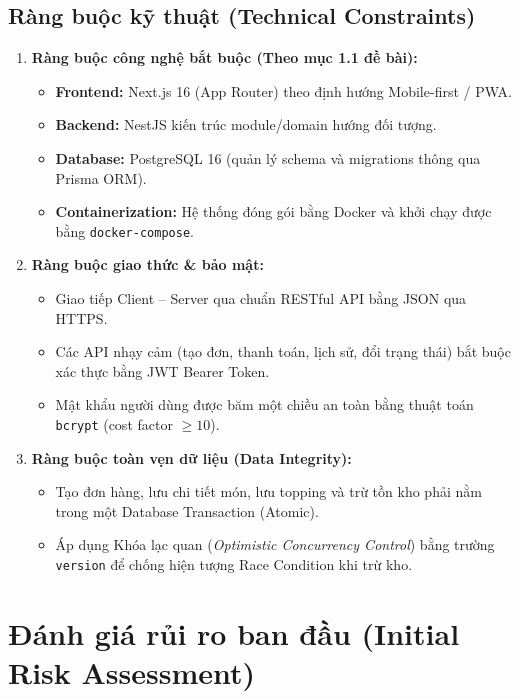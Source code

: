 \documentclass[12pt,a4paper]{article}
\begin{document}
\subsection{Ràng buộc kỹ thuật (Technical Constraints)}
\begin{enumerate}[leftmargin=*,itemsep=2pt]
    \item \textbf{Ràng buộc công nghệ bắt buộc (Theo mục 1.1 đề bài):}
    \begin{itemize}
        \item \textbf{Frontend:} Next.js 16 (App Router) theo định hướng Mobile-first / PWA.
        \item \textbf{Backend:} NestJS kiến trúc module/domain hướng đối tượng.
        \item \textbf{Database:} PostgreSQL 16 (quản lý schema và migrations thông qua Prisma ORM).
        \item \textbf{Containerization:} Hệ thống đóng gói bằng Docker và khởi chạy được bằng \texttt{docker-compose}.
    \end{itemize}
    \item \textbf{Ràng buộc giao thức \& bảo mật:}
    \begin{itemize}
        \item Giao tiếp Client -- Server qua chuẩn RESTful API bằng JSON qua HTTPS.
        \item Các API nhạy cảm (tạo đơn, thanh toán, lịch sử, đổi trạng thái) bắt buộc xác thực bằng JWT Bearer Token.
        \item Mật khẩu người dùng được băm một chiều an toàn bằng thuật toán \texttt{bcrypt} (cost factor $\ge 10$).
    \end{itemize}
    \item \textbf{Ràng buộc toàn vẹn dữ liệu (Data Integrity):}
    \begin{itemize}
        \item Tạo đơn hàng, lưu chi tiết món, lưu topping và trừ tồn kho phải nằm trong một Database Transaction (Atomic).
        \item Áp dụng Khóa lạc quan (\textit{Optimistic Concurrency Control}) bằng trường \texttt{version} để chống hiện tượng Race Condition khi trừ kho.
    \end{itemize}
\end{enumerate}

\clearpage

\section{Đánh giá rủi ro ban đầu (Initial Risk Assessment)}
\end{document}
